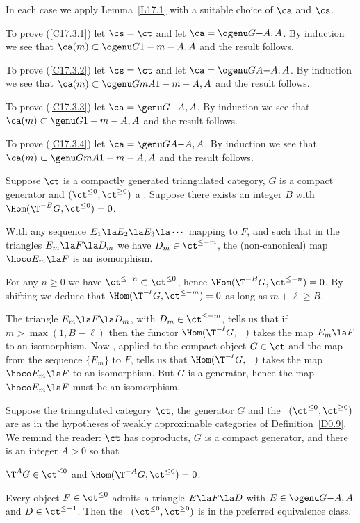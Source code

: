 \documentclass[11pt]{amsart}
\begin{document}
\prf
In each case we apply Lemma~\ref{L17.1} with a suitable choice of $\ca$ and
$\cs$.

To prove (\ref{C17.3.1}) let $\cs=\ct$ and let $\ca=\ogenu G{}{-A,A}$.
By induction we see that $\ca(m)\subset\ogenu G{}{1-m-A,A}$ and the result
follows.

To prove (\ref{C17.3.2}) let $\cs=\ct$ and let $\ca=\ogenu G{A}{-A,A}$.
By induction we see that $\ca(m)\subset\ogenu G{mA}{1-m-A,A}$ and the result
follows.


To prove (\ref{C17.3.3})  let $\ca=\genu G{}{-A,A}$.
By induction we see that $\ca(m)\subset\genu G{}{1-m-A,A}$ and the result
follows.

To prove (\ref{C17.3.4}) let $\ca=\genu G{A}{-A,A}$.
By induction we see that $\ca(m)\subset\genu G{mA}{1-m-A,A}$ and the result
follows.
\eprf

Suppose $\ct$ is a compactly generated triangulated category, $G$ is a
compact generator and  $(\ct^{\leq0},\ct^{\geq0})$ a \tstr. Suppose
there exists an integer
$B$ with $\Hom(\T^{-B}G,\ct^{\leq0})=0$.

With any sequence $E_1\la E_2\la E_3\la\cdots$ mapping to $F$,
and such that in the triangles $E_m\la F\la D_m$ we have $D_m\in\ct^{\leq-m}$,
the (non-canonical) map
$\hoco E_m\la F$ is an isomorphism.
\elem

\prf
For any $n\geq0$ we have $\ct^{\leq-n}\subset\ct^{\leq0}$,
hence
$\Hom(\T^{-B}G,\ct^{\leq-n})=0$. By shifting we deduce that
$\Hom(\T^{-\ell} G,\ct^{\leq-m})=0$ as long as $m+\ell\geq B$.

The triangle $E_m\la F\la D_m$, with $D_m\in\ct^{\leq-m}$, tells us that if
$m>\max(1,B-\ell)$ then the functor $\Hom(\T^{-\ell} G,-)$ takes the map
$E_m\la F$ to an isomorphism. Now \cite[Lemma~2.8]{Neeman96}, applied
to the compact object $G\in\ct$ and the map from the sequence
$\{E_m\}$ to $F$, tells us that $\Hom(\T^{-\ell} G,-)$ takes
the map $\hoco E_m\la F$ to an isomorphism. But $G$ is a generator,
hence the map $\hoco E_m\la F$ must be an isomorphism.
\eprf

Suppose the triangulated
category $\ct$, the generator $G$ and
the \tstr\ $(\ct^{\leq0},\ct^{\geq0})$ are as in the hypotheses of
weakly approximable categories of Definition~\ref{D0.9}.
We remind the reader: $\ct$ has coproducts,
$G$ is a compact generator, and there is an integer $A>0$ so that 
\be
\item
$\T^AG\in\ct^{\leq0}$ and $\Hom(\T^{-A}G,\ct^{\leq0})=0$.
\item
Every object $F\in\ct^{\leq 0}$ admits a triangle
$E\la F\la D$ with $E\in\ogenu G{}{-A,A}$ and
$D\in\ct^{\leq-1}$.
\setcounter{enumiv}{\value{enumi}}
\ee
Then the \tstr\ $(\ct^{\leq0},\ct^{\geq0})$ is in
the preferred equivalence class.
\epro
\end{document}
